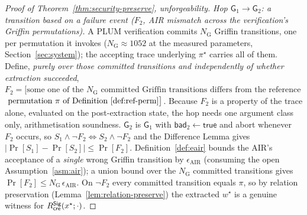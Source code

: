 \begin{proof}[Proof of Theorem~\ref{thm:security-preserve}, unforgeability]
    \smallskip\noindent\emph{Hop $\mathsf G_1\to\mathsf G_2$: a transition based on
a failure event ($F_2$, AIR mismatch across the verification's Griffin permutations).} A PLUM verification commits $N_{\mathrm G}$ Griffin transitions, one per permutation it invokes ($N_{\mathrm G}\approx 1052$ at the measured parameters, Section~\ref{sec:system}); the accepting trace underlying $\pi^\star$ carries all of them. Define, \emph{purely over those committed transitions and independently of whether extraction succeeded}, $F_2=\bigl[\text{some one of the $N_{\mathrm G}$ committed Griffin transitions differs from the reference}$ \\
$\text{ permutation }\pi\text{ of Definition~\ref{def:ref-perm}}\bigr]$. Because $F_2$ is a property of the trace alone, evaluated on the post-extraction state, the hop needs one argument class only, arithmetisation soundness. $\mathsf G_2$ is $\mathsf G_1$ with $\mathsf{bad}_2\leftarrow\mathsf{true}$ and abort whenever $F_2$ occurs, so $S_1\wedge\neg F_2\iff S_2\wedge\neg F_2$ and the Difference Lemma gives $|\Pr[S_1]-\Pr[S_2]|\le\Pr[F_2]$. Definition~\ref{def:eair} bounds the AIR's acceptance of a \emph{single} wrong Griffin transition by $\epsilon_{\mathrm{AIR}}$ (consuming the open Assumption~\ref{asm:air}); a union bound over the $N_{\mathrm G}$ committed transitions gives $\Pr[F_2]\le N_{\mathrm G}\,\epsilon_{\mathrm{AIR}}$. On $\neg F_2$ every committed transition equals $\pi$, so by relation preservation (Lemma~\ref{lem:relation-preserve}) the extracted $w^\star$ is a genuine witness for $R^{\mathsf{Sig}}_{\mathsf{cre}}(x^\star;\cdot)$.


\end{proof}
